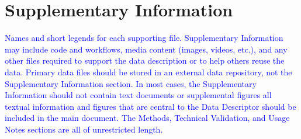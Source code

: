 \documentclass[english,11pt]{article}
\begin{document}
\section*{Supplementary Information}

\textcolor{blue}{Names and short legends for each supporting file. Supplementary Information
may include code and workflows, media content (images, videos, etc.),
and any other files required to support the data description or to
help others reuse the data. Primary data files should be stored in
an external data repository, not the Supplementary Information section.
In most cases, the Supplementary Information should not contain text
documents or supplemental figures \textendash{} all textual information
and figures that are central to the Data Descriptor should be included
in the main document. The Methods, Technical Validation, and Usage
Notes sections are all of unrestricted length. }


{}

\end{document}
